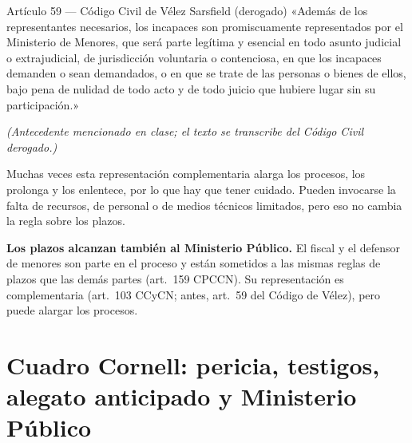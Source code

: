 \documentclass[12pt,oneside]{book}
\begin{document}
\begin{norma}{Artículo 59 --- Código Civil de Vélez Sarsfield (derogado)}
«Además de los representantes necesarios, los incapaces son promiscuamente representados por el Ministerio de Menores, que será parte legítima y esencial en todo asunto judicial o extrajudicial, de jurisdicción voluntaria o contenciosa, en que los incapaces demanden o sean demandados, o en que se trate de las personas o bienes de ellos, bajo pena de nulidad de todo acto y de todo juicio que hubiere lugar sin su participación.»

\textit{(Antecedente mencionado en clase; el texto se transcribe del Código Civil derogado.)}
\end{norma}

Muchas veces esta representación complementaria alarga los procesos, los prolonga y los enlentece, por lo que hay que tener cuidado. Pueden invocarse la falta de recursos, de personal o de medios técnicos limitados, pero eso no cambia la regla sobre los plazos.

\begin{important}
\textbf{Los plazos alcanzan también al Ministerio Público.} El fiscal y el defensor de menores son parte en el proceso y están sometidos a las mismas reglas de plazos que las demás partes (art.~159 CPCCN). Su representación es complementaria (art.~103 CCyCN; antes, art.~59 del Código de Vélez), pero puede alargar los procesos.
\end{important}

\section{Cuadro Cornell: pericia, testigos, alegato anticipado y Ministerio Público}
\end{document}
